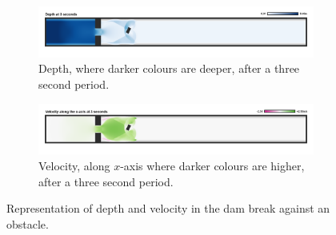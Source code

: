 \begin{figure}
	\centering
	\begin{subfigure}{1.0\textheight}
	\includegraphics[width=1.0\textheight]{numerical-test-figures/dam-break-obstacle-depth-example.png}
	\caption{Depth, where darker colours are deeper, after a three second period.}
	\label{TestResult_DamObstacle_Depth}
	\end{subfigure}
	\begin{subfigure}{1.0\textheight}
	\includegraphics[width=1.0\textheight]{numerical-test-figures/dam-break-obstacle-velocity-example.png}
	\caption{Velocity, along $x$-axis where darker colours are higher, after a three second period.}
	\label{TestResult_DamObstacle_Velocity}
	\end{subfigure}
	\caption{Representation of depth and velocity in the dam break against an obstacle.}
\end{figure}
